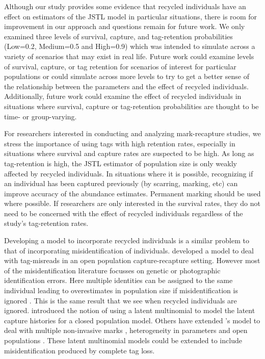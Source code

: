 \documentclass[12pt]{article}
\begin{document}
Although our study provides some evidence that recycled individuals have
an effect on estimators of the JSTL model in particular situations,
there is room for improvement in our approach and questions remain for
future work. We only examined three levels of survival, capture, and
tag-retention probabilities (Low=0.2, Medium=0.5 and High=0.9) which was
intended to simulate across a variety of scenarios that may exist
in real life. Future work could examine levels of survival, capture, or
tag retention for scenarios of interest for particular populations or
could simulate across more levels to try to get a better sense of the
relationship between the parameters and the effect of recycled
individuals. Additionally, future work could examine the effect of
recycled individuals in situations where survival, capture or
tag-retention probabilities are thought to be time- or group-varying.

For researchers interested in conducting and analyzing mark-recapture
studies, we stress the importance of using tags with high retention
rates, especially in situations where survival and capture rates are
suspected to be high. As long as tag-retention is high, the JSTL
estimator of population size is only weakly affected by recycled individuals. In
situations where it is possible, recognizing if an individual has been
captured previously (by scarring, marking, etc) can improve accuracy of the
abundance estimates. Permanent marking should be used where possible. If
researchers are only interested in the survival rates, they do not need
to be concerned with the effect of recycled individuals regardless of
the study's tag-retention rates.

Developing a model to incorporate recycled individuals is a similar problem to that of incorporating misidentification of individuals.  \cite{Schwarz:1999} developed a model to deal with tag-misreads in an open population capture-recapture setting.  However most of the misidentification literature focusses on genetic or photographic identification errors.  Here multiple identities can be assigned to the same individual leading to overestimates in population size if misidentification is ignored \citep{Yoshizaki:2011}. This is the same result that we see when recycled individuals are ignored.   \cite{Link:2010} introduced the notion of using a latent multinomial to model the latent capture histories for a closed population model. Others have extended \citeauthor{Link:2010}'s model to deal with multiple non-invasive marks \citep{Bonner:2013, McClintock:2013}, heterogeneity in parameters \citep{Mcclintock:2014} and open populations \citep{Bonner:2013}.  These latent multinomial models could be extended to include misidentification produced by complete tag loss.
\end{document}
